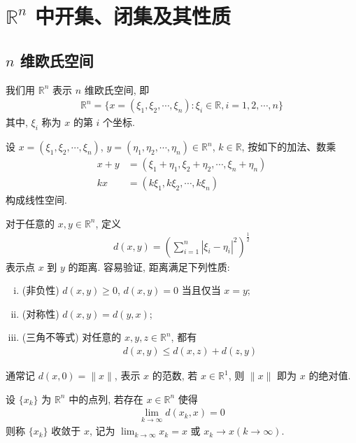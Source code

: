 \documentclass[../../main.tex]{subfiles}
\begin{document}
\section{$\mathbb{R}^n$ 中开集、闭集及其性质}

\subsection{$n$ 维欧氏空间}

我们用 $\mathbb{R}^n$ 表示 $n$ 维欧氏空间, 即
\begin{align*}
\mathbb{R}^n = \{x = (\xi_1, \xi_2, \cdots, \xi_n) : \xi_i \in \mathbb{R}, i = 1, 2, \cdots, n\}
\end{align*}
其中, $\xi_i$ 称为 $x$ 的第 $i$ 个坐标.

设 $x = (\xi_1, \xi_2, \cdots, \xi_n)$, $y = (\eta_1, \eta_2, \cdots, \eta_n) \in \mathbb{R}^n$, $k \in \mathbb{R}$, 按如下的加法、数乘
\begin{align*}
x + y &= (\xi_1 + \eta_1, \xi_2 + \eta_2, \cdots, \xi_n + \eta_n)\\
kx &= (k\xi_1, k\xi_2, \cdots, k\xi_n)
\end{align*}
构成线性空间.

对于任意的 $x, y \in \mathbb{R}^n$, 定义
\begin{align*}
d(x, y) = \left(\sum_{i = 1}^{n}|\xi_i - \eta_i|^2\right)^{\frac{1}{2}}
\end{align*}
表示点 $x$ 到 $y$ 的距离. 容易验证, 距离满足下列性质:
\begin{enumerate}[(i)]
\item (非负性) $d(x, y) \geqslant 0$, $d(x, y) = 0$ 当且仅当 $x = y$;
\item (对称性) $d(x, y) = d(y, x)$;
\item (三角不等式) 对任意的 $x, y, z \in \mathbb{R}^n$, 都有
\begin{align*}
d(x, y) \leqslant d(x, z) + d(z, y)
\end{align*}
\end{enumerate}
通常记 $d(x, 0) = \|x\|$, 表示 $x$ 的范数, 若 $x \in \mathbb{R}^1$, 则 $\|x\|$ 即为 $x$ 的绝对值.

\begin{definition}
设 $\{x_k\}$ 为 $\mathbb{R}^n$ 中的点列, 若存在 $x \in \mathbb{R}^n$ 使得
\begin{align*}
\lim_{k \to \infty} d(x_k, x) = 0
\end{align*}
则称 $\{x_k\}$ 收敛于 $x$, 记为 $\lim_{k \to \infty} x_k = x$ 或 $x_k \to x (k \to \infty)$.
\end{definition}
\end{document}
